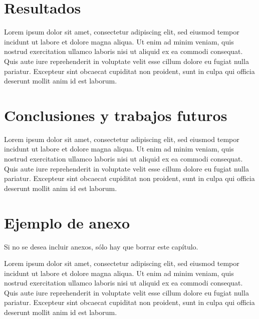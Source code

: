 \documentclass[12pt,a4paper,twoside]{book}
\begin{document}
\chapter{Resultados}
Lorem ipsum dolor sit amet, consectetur adipiscing elit, sed eiusmod tempor incidunt ut labore et dolore magna aliqua. Ut enim ad minim veniam, quis nostrud exercitation ullamco laboris nisi ut aliquid ex ea commodi consequat. Quis aute iure reprehenderit in voluptate velit esse cillum dolore eu fugiat nulla pariatur. Excepteur sint obcaecat cupiditat non proident, sunt in culpa qui officia deserunt mollit anim id est laborum.

\chapter{Conclusiones y trabajos futuros}
Lorem ipsum dolor sit amet, consectetur adipiscing elit, sed eiusmod tempor incidunt ut labore et dolore magna aliqua. Ut enim ad minim veniam, quis nostrud exercitation ullamco laboris nisi ut aliquid ex ea commodi consequat. Quis aute iure reprehenderit in voluptate velit esse cillum dolore eu fugiat nulla pariatur. Excepteur sint obcaecat cupiditat non proident, sunt in culpa qui officia deserunt mollit anim id est laborum.


\appendix
\clearpage
\appendixpage
\addappheadtotoc

\chapter{Ejemplo de anexo}
Si no se desea incluir anexos, sólo hay que borrar este capítulo.
\par
Lorem ipsum dolor sit amet, consectetur adipiscing elit, sed eiusmod tempor
incidunt ut labore et dolore magna aliqua. Ut enim ad minim veniam, quis nostrud exercitation ullamco laboris nisi ut aliquid ex ea commodi consequat. Quis aute iure reprehenderit in voluptate velit esse cillum dolore eu fugiat nulla pariatur. Excepteur sint obcaecat cupiditat non proident, sunt in culpa qui officia deserunt mollit anim id est laborum.\\


\pagebreak
\thispagestyle{empty}
\pagestyle{empty}


\end{document}
